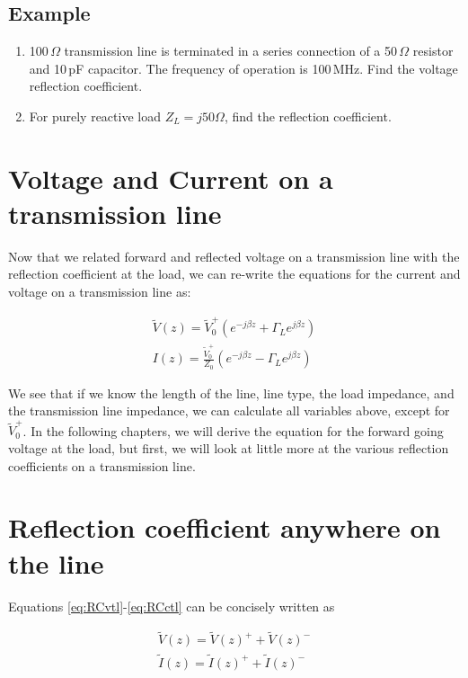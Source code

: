 \documentclass{ximera}
\begin{document}
\subsection{Example}


 \begin{enumerate}
\item 100\,$\Omega$ transmission line is terminated in a series
connection of a 50\,$\Omega$ resistor and 10\,pF capacitor. The frequency
of operation is 100\,MHz. Find the voltage reflection coefficient.
\item For purely reactive load $Z_L=j 50 \Omega$, find the reflection
coefficient.
\end{enumerate}

\section{Voltage and Current on a transmission line}

Now that we related forward and reflected voltage on a transmission line with the reflection coefficient at the load, we can re-write the equations for the current and voltage on a transmission line as:

\begin{eqnarray}
\tilde{V}(z)= \tilde{V}_0^+ (e^{-j \beta z} + \Gamma_L  e^{j \beta z }  ) \label{eq:vtlfin} \\
I(z)=   \frac{\tilde{V}_0^+}{Z_0}  (e^{-j \beta z} - \Gamma_L  e^{j \beta z}  ) \label{eq:itlfin}
\end{eqnarray}

We see that if we know the length of the line, line type, the load impedance, and the transmission line impedance, we can calculate all variables above, except for  $\tilde{V}_0^+ $. In the following chapters, we will derive the equation for the forward going voltage at the load, but first, we will look at little more at the various reflection coefficients on a transmission line. 

\section{Reflection coefficient anywhere on the line}

Equations \ref{eq:RCvtl}-\ref{eq:RCctl}  can be concisely written as 

\begin{eqnarray}
\tilde{V}(z) =\tilde{V}(z)^+ + \tilde{V}(z)^- \\
\tilde{I}(z) =\tilde{I}(z)^+ + \tilde{I}(z)^- 
\end{eqnarray}
\end{document}
